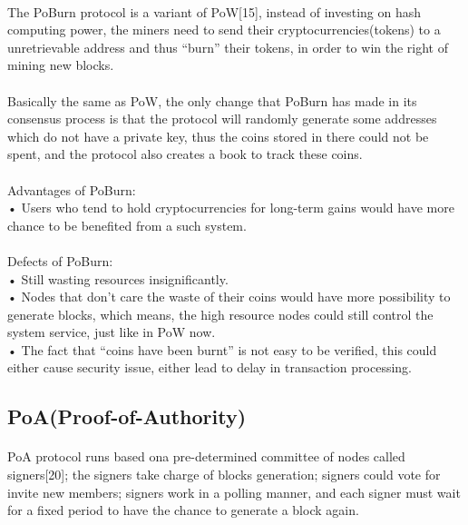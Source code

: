 \documentclass[doublespacing]{bmcart}
\begin{document}
\begin{CJK*}{UTF8}{gbsn}
		\paragraph{} 
	The PoBurn protocol is a variant of PoW[15], instead of investing on hash computing power, the miners need to send their cryptocurrencies(tokens) to a unretrievable address and thus ``burn'' their tokens, in order to win the right of mining new blocks.
		\paragraph{} 
	Basically the same as PoW, the only change that PoBurn has made in its consensus process is that the protocol will randomly generate some addresses which do not have a private key, thus the coins stored in there could not be spent, and the protocol also creates a book to track these coins. 
	\paragraph{} 
Advantages of PoBurn:
\\• Users who tend to hold cryptocurrencies for long-term gains would have more chance to be benefited from a such system.
	\paragraph{} 
Defects of PoBurn:
\\• Still wasting resources insignificantly.
\\• Nodes that don't care the waste of their coins would have more possibility to generate blocks, which means, the high resource nodes could still control the system service, just like in PoW now.
\\• The fact that ``coins have been burnt'' is not easy to be verified, this could either cause security issue, either lead to delay in transaction processing.
	
	\subsection{PoA(Proof-of-Authority)}
	\paragraph{} 
	PoA protocol runs based ona  pre-determined committee of nodes called signers[20]; the signers take charge of blocks generation; signers could vote for invite new members; signers work in a polling manner, and each signer must wait for a fixed period to have the chance to generate a block again.

\end{CJK*}
\end{document}
